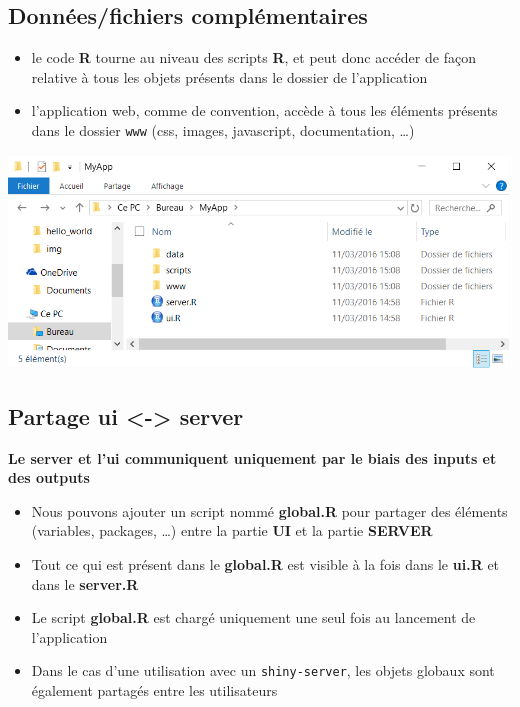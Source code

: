 \documentclass[]{article}
\providecommand{\tightlist}{%
  \setlength{\itemsep}{0pt}\setlength{\parskip}{0pt}}
\begin{document}
\subsection{Données/fichiers
complémentaires}\label{donneesfichiers-complementaires}

\begin{itemize}
\tightlist
\item
  le code \textbf{R} tourne au niveau des scripts \textbf{R}, et peut
  donc accéder de façon relative à tous les objets présents dans le
  dossier de l'application
\item
  l'application web, comme de convention, accède à tous les éléments
  présents dans le dossier \texttt{www} (css, images, javascript,
  documentation, \ldots{})
\end{itemize}

\includegraphics{img/more_apps.png}

\subsection{Partage ui \textless{}-\textgreater{}
server}\label{partage-ui---server}

\textbf{Le server et l'ui communiquent uniquement par le biais des
inputs et des outputs}

\begin{itemize}
\item
  Nous pouvons ajouter un script nommé \textbf{global.R} pour partager
  des éléments (variables, packages, \ldots{}) entre la partie
  \textbf{UI} et la partie \textbf{SERVER}
\item
  Tout ce qui est présent dans le \textbf{global.R} est visible à la
  fois dans le \textbf{ui.R} et dans le \textbf{server.R}
\item
  Le script \textbf{global.R} est chargé uniquement une seul fois au
  lancement de l'application
\item
  Dans le cas d'une utilisation avec un \texttt{shiny-server}, les
  objets globaux sont également partagés entre les utilisateurs
\end{itemize}
\end{document}
